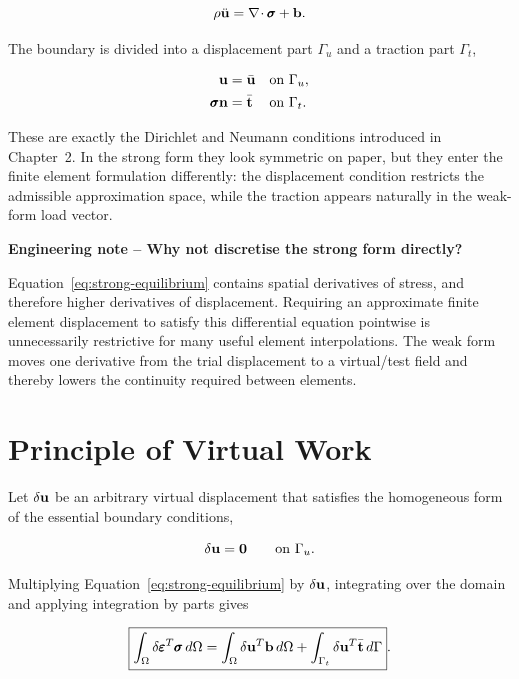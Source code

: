 \begin{equation}
    \rho\ddot{\mathbf{u}}
    =\nabla\!\cdot\pmb{\sigma}+\mathbf{b}.
\end{equation}

The boundary is divided into a displacement part $\Gamma_u$ and a traction part
$\Gamma_t$,

\begin{align}
    \mathbf{u}&=\bar{\mathbf{u}}
        &&\text{on }\Gamma_u,\\
    \pmb{\sigma}\mathbf{n}&=\bar{\mathbf{t}}
        &&\text{on }\Gamma_t.
\end{align}

These are exactly the Dirichlet and Neumann conditions introduced in
Chapter~2. In the strong form they look symmetric on paper, but they enter the
finite element formulation differently: the displacement condition restricts
the admissible approximation space, while the traction appears naturally in
the weak-form load vector.

\begin{bbox}
\textbf{Engineering note -- Why not discretise the strong form directly?}

Equation~\eqref{eq:strong-equilibrium} contains spatial derivatives of stress,
and therefore higher derivatives of displacement. Requiring an approximate
finite element displacement to satisfy this differential equation pointwise is
unnecessarily restrictive for many useful element interpolations. The weak form
moves one derivative from the trial displacement to a virtual/test field and
thereby lowers the continuity required between elements.
\end{bbox}

\section{Principle of Virtual Work}

Let $\delta\mathbf{u}$ be an arbitrary virtual displacement that satisfies the
homogeneous form of the essential boundary conditions,

\begin{equation}
    \delta\mathbf{u}=\mathbf{0}\qquad\text{on }\Gamma_u.
\end{equation}

Multiplying Equation~\eqref{eq:strong-equilibrium} by $\delta\mathbf{u}$, integrating
over the domain and applying integration by parts gives

\begin{equation}\label{eq:virtual-work-continuum}
    \boxed{
    \int_{\Omega}
    \delta\pmb{\varepsilon}^T\pmb{\sigma}\,d\Omega
    =
    \int_{\Omega}\delta\mathbf{u}^T\mathbf{b}\,d\Omega
    +
    \int_{\Gamma_t}\delta\mathbf{u}^T\bar{\mathbf{t}}\,d\Gamma
    }.
\end{equation}

